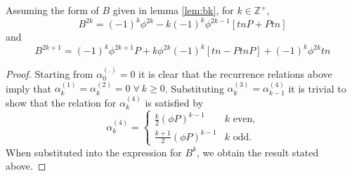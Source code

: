 \begin{lemma}
\label{lem:bkexp}
Assuming the form of $B$ given in lemma \ref{lem:bk}, for 
$k\in \mathbb{Z}^{+}$,\[
B^{2k}=(-1)^k\phi^{2k}-k(-1)^k\phi^{2k-1}[tnP + Ptn]
\]and\[
B^{2k+1}=(-1)^k\phi^{2k+1}P + k \phi^{2k} (-1)^k [ tn - PtnP ] + (-1)^k\phi^{2k} tn
\]
\end{lemma}
\begin{proof}
Starting from $\alpha _{0}^{(.)}=0$ it is clear that the recurrence
relations above imply that $\alpha _{k}^{(1)}=\alpha _{k}^{(2)}=0\; \forall \: k \ge 0$.
Substituting $\alpha _{k}^{(3)}=\alpha _{k-1}^{(4)}$ it is trivial to show
that the relation for $\alpha _{k}^{(4)}$ is satisfied by \[
\alpha _{k}^{(4)}=\begin{cases}
 \frac{k}{2}(\phi P)^{k-1} & k\textrm{ even,}\\
 \frac{k+1}{2}(\phi P)^{k-1} & k\textrm{ odd.}\end{cases}\]
When substituted into the expression for $B^{k}$, we obtain the
result stated above.
\end{proof}

